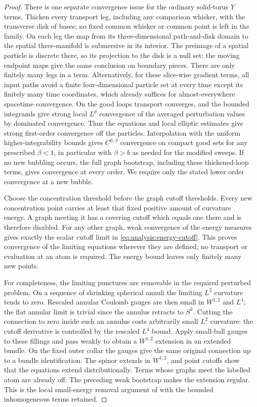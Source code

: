 \begin{proof}
There is one separate convergence issue for the ordinary solid-torus
$Y$ terms.  Thicken every transport leg, including any comparison
whisker, with the transverse disk of bases; no fixed common whisker
or common point is left in the family.  On each leg the map from
its three-dimensional path-and-disk domain to the spatial three-manifold
is submersive in its interior.  The preimage of a spatial particle
is discrete there, so its projection to the disk is a null set;
the moving endpoint maps give the same conclusion on boundary pieces.
There are only finitely many legs in a term.  Alternatively, for
these slice-wise gradient terms, all input paths avoid a finite
four-dimensional particle set at every time except its finitely many
time coordinates, which already suffices for almost-everywhere
spacetime convergence.  On the good loops transport converges, and
the bounded integrands give strong local $L^p$
convergence of the averaged perturbation values by dominated
convergence.  Thus the equations and local elliptic estimates give
strong first-order convergence off the particles.  Interpolation with
the uniform higher-integrability bounds gives $C^{0,\beta}$ convergence
on compact good sets for any prescribed $\beta<1$, in particular with
$\beta>b$ as needed for the modified sweeps.  If no new bubbling
occurs, the full graph bootstrap, including these thickened-loop terms,
gives convergence at every order.  We require only the stated lower
order convergence at a new bubble.

Choose the concentration threshold before the graph cutoff thresholds.
Every new concentration point carries at least that fixed positive
amount of curvature energy.  A graph meeting it has a covering cutoff
which equals one there and is therefore disabled.  For any other graph,
weak convergence of the energy measures gives exactly the scalar
cutoff limit in \eqref{eq:analysis:energy-cutoff}.  This proves
convergence of the limiting equations wherever they are defined;
no transport or evaluation at an atom is required.  The energy bound
leaves only finitely many new points.

For completeness, the limiting punctures are removable in the required
perturbed problem.  On a sequence of shrinking spherical annuli the
limiting $L^2$ curvature tends to zero.  Rescaled annular Coulomb gauges
are then small in $W^{1,2}$ and $L^4$; the flat annular limit is trivial
since the annulus retracts to $S^3$.  Cutting the connection to zero
inside such an annulus costs arbitrarily small $L^2$ curvature: the
cutoff derivative is controlled by the rescaled $L^4$ bound.  Apply
small-ball gauges to these fillings and pass weakly to obtain a
$W^{1,2}$ extension in an extended bundle.  On the fixed outer collar
the gauges give the same original connection up to a bundle
identification.  The spinor extends in $W^{1,2}$, and point cutoffs show
that the equations extend distributionally.  Terms whose graphs meet
the labelled atom are already off.  The preceding weak bootstrap makes
the extension regular.  This is the local small-energy removal
argument of \cite{Uhlenbeck1982Removable} with the bounded inhomogeneous
terms retained.


\end{proof}
